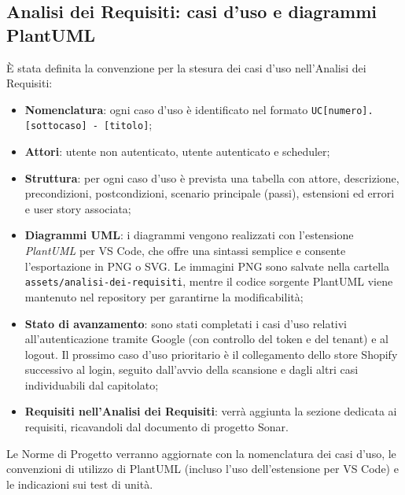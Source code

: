 \subsection{Analisi dei Requisiti: casi d'uso e diagrammi PlantUML}
È stata definita la convenzione per la stesura dei casi d'uso nell'Analisi dei Requisiti:
\begin{itemize}
    \item \textbf{Nomenclatura}: ogni caso d'uso è identificato nel formato \texttt{UC[numero].[sottocaso] - [titolo]};
    \item \textbf{Attori}: utente non autenticato, utente autenticato e scheduler;
    \item \textbf{Struttura}: per ogni caso d'uso è prevista una tabella con attore, descrizione, precondizioni, postcondizioni, scenario principale (passi), estensioni ed errori e user story associata;
    \item \textbf{Diagrammi UML}: i diagrammi vengono realizzati con l'estensione \emph{PlantUML} per VS Code, che offre una sintassi semplice e consente l'esportazione in PNG o SVG. Le immagini PNG sono salvate nella cartella \texttt{assets/analisi-dei-requisiti}, mentre il codice sorgente PlantUML viene mantenuto nel repository per garantirne la modificabilità;
    \item \textbf{Stato di avanzamento}: sono stati completati i casi d'uso relativi all'autenticazione tramite Google (con controllo del token e del tenant) e al logout. Il prossimo caso d'uso prioritario è il collegamento dello store Shopify successivo al login, seguito dall'avvio della scansione e dagli altri casi individuabili dal capitolato;
    \item \textbf{Requisiti nell'Analisi dei Requisiti}: verrà aggiunta la sezione dedicata ai requisiti, ricavandoli dal documento di progetto Sonar.
\end{itemize}
Le Norme di Progetto verranno aggiornate con la nomenclatura dei casi d'uso, le convenzioni di utilizzo di PlantUML (incluso l'uso dell'estensione per VS Code) e le indicazioni sui test di unità.


